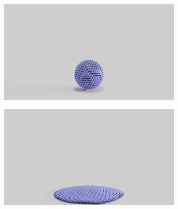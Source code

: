 \begin{figure}[htp!]
\begin{subfigure}{.16\linewidth}
		\label{sfig:ball-045-6}
	\end{subfigure}\hfill
	\begin{subfigure}{.03\linewidth}
	\end{subfigure}%
	\begin{subfigure}{.16\linewidth}
		\centering
		{\includegraphics[width=2.0\textwidth]{images/coarse_ball/0495/0200.jpg}}
		\label{sfig:ball-0495-1}
	\end{subfigure}%
	\begin{subfigure}{.16\linewidth}
		\centering
		{\includegraphics[width=2.0\textwidth]{images/coarse_ball/0495/0250.jpg}}
		\label{sfig:ball-0495-2}
	\end{subfigure}%
	\begin{subfigure}{.16\linewidth} 
\end{subfigure}
\end{figure}
